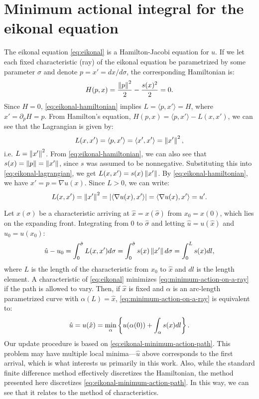 \documentclass[eikonal.tex]{subfiles}
\begin{document}
\section[Minimum action integral]{Minimum actional integral for the
  eikonal equation}

The eikonal equation \cref{eq:eikonal} is a Hamilton-Jacobi equation
for $u$. If we let each fixed characteristic (ray) of the eikonal
equation be parametrized by some parameter $\sigma$ and denote
$p = x' = dx/d\sigma$, the corresponding Hamiltonian is:
\begin{equation}
  \label{eq:eikonal-hamiltonian}
  H{(p, x)} = \frac{\norm{p}^2}{2} - \frac{s(x)^2}{2} = 0.
\end{equation}
Since $H = 0$, \cref{eq:eikonal-hamiltonian} implies
$L = \langle p, x'\rangle = H$, where $x' = \partial_p H = p$.  From
Hamilton's equation, $H(p, x) = \langle p, x'\rangle - L(x, x')$, we
can see that the Lagrangian is given by:
\begin{equation}
  \label{eq:eikonal-lagrangian}
  L(x, x') = \langle p, x'\rangle = \langle x', x'\rangle = \norm{x'}^2,
\end{equation}
i.e. $L = \left\|x'\right\|^2$. From \cref{eq:eikonal-hamiltonian}, we can
also see that $s(x) = \left\|p\right\| = \left\|x'\right\|$, since $s$ was assumed to
be nonnegative. Substituting this into \cref{eq:eikonal-lagrangian},
we get $L(x, x') = s(x) \left\|x'\right\|$. By \cref{eq:eikonal-hamiltonian},
we have $x' = p = \nabla u(x)$. Since $L > 0$, we can write:
\begin{equation}
  L(x, x') = \left\|x'\right\|^2 = \left|\langle \nabla u(x), x'\rangle\right| = \langle \nabla u(x), x'\rangle = u'.
\end{equation}

Let $x(\sigma)$ be a characteristic arriving at
$\hat{x} = x(\hat\sigma)$ from $x_0 = x(0)$, which lies on the
expanding front. Integrating from $0$ to $\hat\sigma$ and letting
$\hat u = u(\hat x)$ and $u_0 = u(x_0)$:
\begin{equation}
  \label{eq:minimum-action-on-a-ray}
  \hat u - u_0 = \int_{0}^{\hat\sigma} L(x, x') d\sigma = \int_{0}^{\hat\sigma} s(x) \norm{x'} d\sigma = \int_0^L s(x) dl,
\end{equation}
where $L$ is the length of the characteristic from $x_0$ to $\hat{x}$
and $dl$ is the length element. A characteristic of \cref{eq:eikonal}
minimizes \cref{eq:minimum-action-on-a-ray} if the path is allowed to
vary. Then, if $\hat{x}$ is fixed and $\alpha$ is an arc-length
parametrized curve with $\alpha(L) = \hat{x}$,
\cref{eq:minimum-action-on-a-ray} is equivalent to:
\begin{equation}\label{eq:eikonal-minimum-action-path}
  \hat{u} = u(\hat{x}) = \min_\alpha \curlyb{u(\alpha(0)) + \int_\alpha s(x) dl}.
\end{equation}
Our update procedure is based on
\cref{eq:eikonal-minimum-action-path}. This problem may have multiple
local minima---$\hat{u}$ above corresponds to the first arrival, which
is what interests us primarily in this work. Also, while the standard
finite difference method effectively discretizes the Hamiltonian, the
method presented here discretizes
\cref{eq:eikonal-minimum-action-path}. In this way, we can see that it
relates to the method of characteristics.
\end{document}
